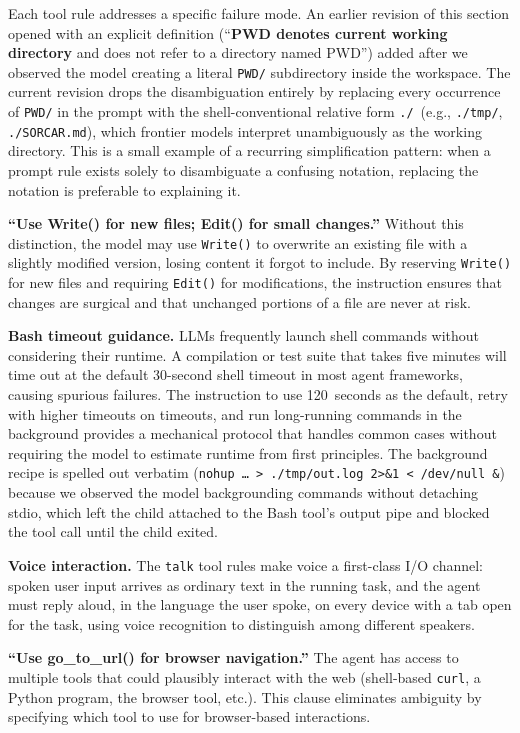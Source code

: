 \documentclass{article}
\begin{document}
Each tool rule addresses a specific failure mode.  An earlier revision of this section opened with an explicit definition (``\textbf{PWD denotes current working directory} and does not refer to a directory named PWD'') added after we observed the model creating a literal \texttt{PWD/} subdirectory inside the workspace.  The current revision drops the disambiguation entirely by replacing every occurrence of \texttt{PWD/} in the prompt with the shell-conventional relative form \texttt{./}~(e.g., \texttt{./tmp/}, \texttt{./SORCAR.md}), which frontier models interpret unambiguously as the working directory.  This is a small example of a recurring simplification pattern: when a prompt rule exists solely to disambiguate a confusing notation, replacing the notation is preferable to explaining it.

\textbf{``Use Write() for new files; Edit() for small changes.''}  Without this distinction, the model may use \texttt{Write()} to overwrite an existing file with a slightly modified version, losing content it forgot to include.  By reserving \texttt{Write()} for new files and requiring \texttt{Edit()} for modifications, the instruction ensures that changes are surgical and that unchanged portions of a file are never at risk.

\textbf{Bash timeout guidance.}  LLMs frequently launch shell commands without considering their runtime.  A compilation or test suite that takes five minutes will time out at the default 30-second shell timeout in most agent frameworks, causing spurious failures.  The instruction to use 120~seconds as the default, retry with higher timeouts on timeouts, and run long-running commands in the background provides a mechanical protocol that handles common cases without requiring the model to estimate runtime from first principles.  The background recipe is spelled out verbatim (\texttt{nohup \ldots\ > ./tmp/out.log 2>\&1 < /dev/null \&}) because we observed the model backgrounding commands without detaching stdio, which left the child attached to the Bash tool's output pipe and blocked the tool call until the child exited.

\textbf{Voice interaction.}  The \texttt{talk} tool rules make voice a first-class I/O channel: spoken user input arrives as ordinary text in the running task, and the agent must reply aloud, in the language the user spoke, on every device with a tab open for the task, using voice recognition to distinguish among different speakers.

\textbf{``Use go\_to\_url() for browser navigation.''}  The agent has access to multiple tools that could plausibly interact with the web (shell-based \texttt{curl}, a Python program, the browser tool, etc.).  This clause eliminates ambiguity by specifying which tool to use for browser-based interactions.
\end{document}
